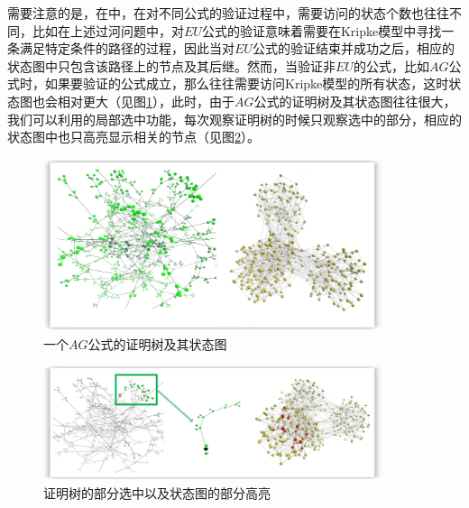 	需要注意的是，在\sctlprov{}中，在对不同公式的验证过程中，需要访问的状态个数也往往不同，比如在上述过河问题中，对$EU$公式的验证意味着需要在Kripke模型中寻找一条满足特定条件的路径的过程，因此当对$EU$公式的验证结束并成功之后，相应的状态图中只包含该路径上的节点及其后继。然而，当验证非$EU$的公式，比如$AG$公式时，如果要验证的公式成立，那么\sctlprov{}往往需要访问Kripke模型的所有状态，这时状态图也会相对更大（见图\ref{vmdv:example:ag}），此时，由于$AG$公式的证明树及其状态图往往很大，我们可以利用的局部选中功能，每次观察证明树的时候只观察选中的部分，相应的状态图中也只高亮显示相关的节点（见图\ref{vmdv:example:ag:part}）。
	\begin{figure}[h!]
		\centering
		\caption{一个$AG$公式的证明树及其状态图}
		\label{vmdv:example:ag}
		\includegraphics[width=10cm]{Img/ag_proof_state.png}
	
	\end{figure}
	\begin{figure}[h!]
		\centering
		\caption{证明树的部分选中以及状态图的部分高亮}
		\label{vmdv:example:ag:part}
		\includegraphics[width=10cm]{Img/ag_part_detail.png}
		
	\end{figure}
